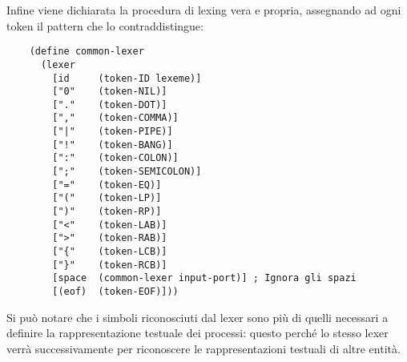 Infine viene dichiarata la procedura di lexing vera e propria,
assegnando ad ogni token il pattern che lo contraddistingue:

\begin{lstlisting}
    (define common-lexer
      (lexer
        [id     (token-ID lexeme)]
        ["0"    (token-NIL)]
        ["."    (token-DOT)]
        [","    (token-COMMA)]
        ["|"    (token-PIPE)]
        ["!"    (token-BANG)]
        [":"    (token-COLON)]
        [";"    (token-SEMICOLON)]
        ["="    (token-EQ)]
        ["("    (token-LP)]
        [")"    (token-RP)]
        ["<"    (token-LAB)]
        [">"    (token-RAB)]
        ["{"    (token-LCB)]
        ["}"    (token-RCB)]
        [space  (common-lexer input-port)] ; Ignora gli spazi
        [(eof)  (token-EOF)]))
\end{lstlisting}

Si pu\`o notare che i simboli riconosciuti dal lexer sono pi\`u di
quelli necessari a definire la rappresentazione testuale dei processi:
questo perch\'e lo stesso lexer verr\`a successivamente per riconoscere
le rappresentazioni testuali di altre entit\`a.
